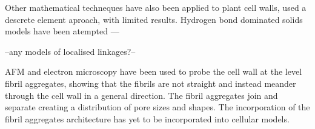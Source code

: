 Other mathematical techneques have also been applied to plant cell walls, \cite{HEPWORTH_1998} used a descrete element aproach, with limited results. Hydrogen bond dominated solids models have been atempted ---

--any models of localised linkages?--

AFM and electron microscopy have been used to probe the cell wall at the level fibril aggregates, showing that the fibrils are not straight and instead meander through the cell wall in a general direction. The fibril aggregates join and separate creating a distribution of pore sizes and shapes. The incorporation of the fibril aggregates architecture has yet to be incorporated into cellular models. 